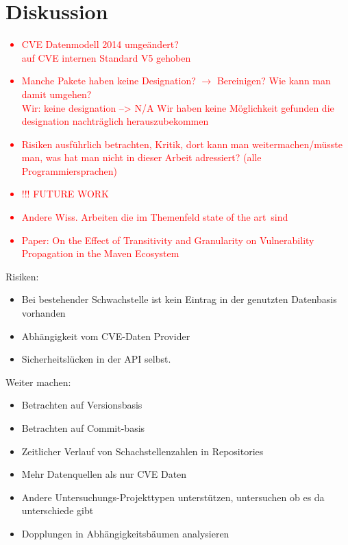 \section{Diskussion} \label{sec:Diskussion}
    \textcolor{red}{
        \begin{itemize}
            \item \ac{CVE} Datenmodell 2014 umgeändert? \\
                auf CVE internen Standard V5 gehoben
            \item Manche Pakete haben keine Designation? $\rightarrow$ Bereinigen? Wie kann man damit umgehen? \\
                Wir: keine designation --> N/A
                Wir haben keine Möglichkeit gefunden die designation nachträglich herauszubekommen 
            \item Risiken ausführlich betrachten, Kritik, dort kann man weitermachen/müsste man, was hat man nicht in dieser Arbeit adressiert? (alle Programmiersprachen)
            \item !!! FUTURE WORK
            \item Andere Wiss. Arbeiten die im Themenfeld \glqq state of the art\grqq~sind
            \item Paper: On the Effect of Transitivity and Granularity on Vulnerability Propagation in the Maven Ecosystem
        \end{itemize}
    }
    Risiken:
    \begin{itemize}
        \item Bei bestehender Schwachstelle ist kein Eintrag in der genutzten Datenbasis vorhanden
        \item Abhängigkeit vom \ac{CVE}-Daten Provider
        \item Sicherheitslücken in der \ac{API} selbst.
    \end{itemize}

    Weiter machen:
    \begin{itemize}
        \item Betrachten auf Versionsbasis
        \item Betrachten auf Commit-basis
        \item Zeitlicher Verlauf von Schachstellenzahlen in Repositories
        \item Mehr Datenquellen als nur CVE Daten
        \item Andere Untersuchungs-Projekttypen unterstützen, untersuchen ob es da unterschiede gibt
        \item Dopplungen in Abhängigkeitsbäumen analysieren
    \end{itemize}

